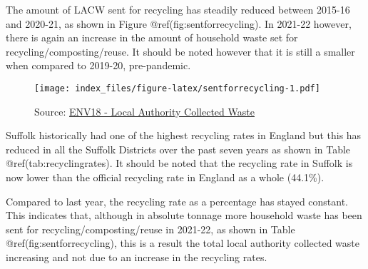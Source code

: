 \documentclass[
]{article}
\begin{document}
The amount of LACW sent for recycling has steadily reduced between
2015-16 and 2020-21, as shown in Figure @ref(fig:sentforrecycling). In
2021-22 however, there is again an increase in the amount of household
waste set for recycling/composting/reuse. It should be noted however
that it is still a smaller when compared to 2019-20, pre-pandemic.

\begin{figure}
\centering
\texttt{[image: index\_files/figure-latex/sentforrecycling-1.pdf]}
\caption{Source:
\href{https://www.gov.uk/government/statistical-data-sets/env18-local-authority-collected-waste-annual-results-tables}{ENV18
- Local Authority Collected Waste}}
\end{figure}

Suffolk historically had one of the highest recycling rates in England
but this has reduced in all the Suffolk Districts over the past seven
years as shown in Table @ref(tab:recyclingrates). It should be noted
that the recycling rate in Suffolk is now lower than the official
recycling rate in England as a whole (44.1\%).

Compared to last year, the recycling rate as a percentage has stayed
constant. This indicates that, although in absolute tonnage more
household waste has been sent for recycling/composting/reuse in 2021-22,
as shown in Table @ref(fig:sentforrecycling), this is a result the total
local authority collected waste increasing and not due to an increase in
the recycling rates.

\providecommand{\docline}[3]{\noalign{\global\setlength{\arrayrulewidth}{#1}}\arrayrulecolor[HTML]{#2}\cline{#3}}

\setlength{\tabcolsep}{0pt}

\renewcommand*{\arraystretch}{1.5}
\end{document}
